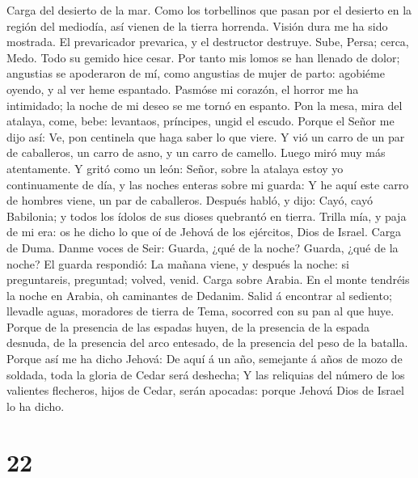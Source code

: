  Carga del desierto de la mar. Como los torbellinos que
pasan por el desierto en la región del mediodía, así vienen de la tierra
horrenda.  Visión dura me ha sido mostrada. El prevaricador
prevarica, y el destructor destruye. Sube, Persa; cerca, Medo. Todo su
gemido hice cesar.  Por tanto mis lomos se han llenado de
dolor; angustias se apoderaron de mí, como angustias de mujer de parto:
agobiéme oyendo, y al ver heme espantado.  Pasmóse mi
corazón, el horror me ha intimidado; la noche de mi deseo se me tornó en
espanto.  Pon la mesa, mira del atalaya, come, bebe:
levantaos, príncipes, ungid el escudo.  Porque el Señor me
dijo así: Ve, pon centinela que haga saber lo que viere.  Y
vió un carro de un par de caballeros, un carro de asno, y un carro de
camello. Luego miró muy más atentamente.  Y gritó como un
león: Señor, sobre la atalaya estoy yo continuamente de día, y las
noches enteras sobre mi guarda:  Y he aquí este carro de
hombres viene, un par de caballeros. Después habló, y dijo: Cayó, cayó
Babilonia; y todos los ídolos de sus dioses quebrantó en tierra.
 Trilla mía, y paja de mi era: os he dicho lo que oí de
Jehová de los ejércitos, Dios de Israel.  Carga de Duma.
Danme voces de Seir: Guarda, ¿qué de la noche? Guarda, ¿qué de la noche?
 El guarda respondió: La mañana viene, y después la noche:
si preguntareis, preguntad; volved, venid.  Carga sobre
Arabia. En el monte tendréis la noche en Arabia, oh caminantes de
Dedanim.  Salid á encontrar al sediento; llevadle aguas,
moradores de tierra de Tema, socorred con su pan al que huye.
 Porque de la presencia de las espadas huyen, de la
presencia de la espada desnuda, de la presencia del arco entesado, de la
presencia del peso de la batalla.  Porque así me ha dicho
Jehová: De aquí á un año, semejante á años de mozo de soldada, toda la
gloria de Cedar será deshecha;  Y las reliquias del número
de los valientes flecheros, hijos de Cedar, serán apocadas: porque
Jehová Dios de Israel lo ha dicho.

\hypertarget{section-21}{%
\section{22}\label{section-21}}

